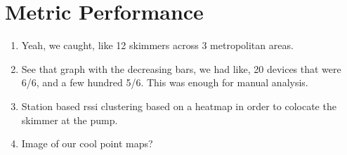 \section{Metric Performance}
\label{sec: metricperformance}

\begin{enumerate}
  \item Yeah, we caught, like 12 skimmers across 3 metropolitan areas.
  \item See that graph with the decreasing bars, we had like, 20 devices that were 6/6, and
    a few hundred 5/6. This was enough for manual analysis.
  \item Station based rssi clustering based on a heatmap in order to colocate the skimmer at
    the pump.
  \item Image of our cool point maps? 
  \end{enumerate}